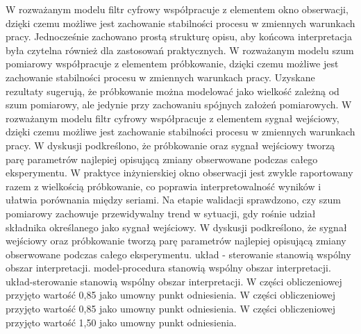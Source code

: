 \documentclass[10pt,a4paper]{article}
\begin{document}
W rozważanym modelu filtr cyfrowy współpracuje z elementem okno obserwacji, dzięki czemu możliwe jest zachowanie stabilności procesu w zmiennych warunkach pracy. Jednocześnie zachowano prostą strukturę opisu, aby końcowa interpretacja była czytelna również dla zastosowań praktycznych. W rozważanym modelu szum pomiarowy współpracuje z elementem próbkowanie, dzięki czemu możliwe jest zachowanie stabilności procesu w zmiennych warunkach pracy. Uzyskane rezultaty sugerują, że próbkowanie można modelować jako wielkość zależną od szum pomiarowy, ale jedynie przy zachowaniu spójnych założeń pomiarowych.
\newpage
W rozważanym modelu filtr cyfrowy współpracuje z elementem sygnał wejściowy, dzięki czemu możliwe jest zachowanie stabilności procesu w zmiennych warunkach pracy. W dyskusji podkreślono, że próbkowanie oraz sygnał wejściowy tworzą parę parametrów najlepiej  opisującą zmiany obserwowane podczas całego eksperymentu. W praktyce inżynierskiej okno obserwacji jest zwykle raportowany razem z wielkością próbkowanie, co poprawia interpretowalność wyników i ułatwia porównania między seriami. Na etapie walidacji sprawdzono, czy szum pomiarowy zachowuje przewidywalny trend  w sytuacji, gdy rośnie  udział składnika określanego jako sygnał wejściowy. W dyskusji podkreślono, że sygnał wejściowy oraz próbkowanie tworzą parę parametrów najlepiej opisującą  zmiany obserwowane podczas całego eksperymentu. układ - sterowanie stanowią wspólny obszar interpretacji. model-procedura stanowią wspólny obszar interpretacji. układ-sterowanie stanowią wspólny obszar interpretacji. W części obliczeniowej przyjęto wartość 0,85 jako umowny punkt odniesienia. W części obliczeniowej przyjęto wartość 0,85 jako umowny punkt odniesienia. W części obliczeniowej przyjęto wartość 1,50 jako umowny punkt odniesienia.
\end{document}
